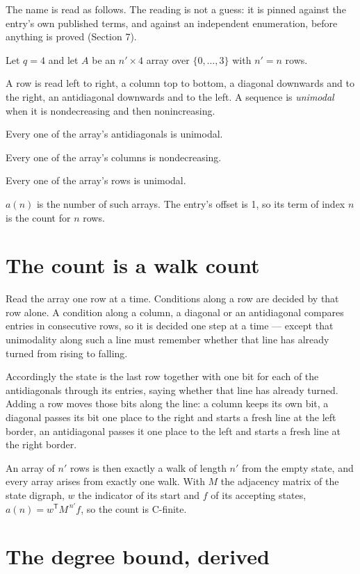 \documentclass[11pt]{article}
\theoremstyle{definition}
\begin{document}
The name is read as follows. The reading is not a guess: it is pinned against the entry's own published terms, and against an independent enumeration, before anything is proved (Section 7).

Let $q = 4$ and let $A$ be an $n' \times 4$ array over $\{0,\dots,3\}$ with $n' = n$ rows.

A row is read left to right, a column top to bottom, a diagonal downwards and to the right, an antidiagonal downwards and to the left. A sequence is {\itshape unimodal} when it is nondecreasing and then nonincreasing.

Every one of the array's antidiagonals is unimodal.

Every one of the array's columns is nondecreasing.

Every one of the array's rows is unimodal.

$a(n)$ is the number of such arrays. The entry's offset is 1, so its term of index $n$ is the count for $n$ rows.

\section{The count is a walk count}

Read the array one row at a time. Conditions along a row are decided by that row alone. A condition along a column, a diagonal or an antidiagonal compares entries in consecutive rows, so it is decided one step at a time --- except that unimodality along such a line must remember whether that line has already turned from rising to falling.

Accordingly the state is the last row together with one bit for each of the antidiagonals through its entries, saying whether that line has already turned. Adding a row moves those bits along the line: a column keeps its own bit, a diagonal passes its bit one place to the right and starts a fresh line at the left border, an antidiagonal passes it one place to the left and starts a fresh line at the right border.

An array of $n'$ rows is then exactly a walk of length $n'$ from the empty state, and every array arises from exactly one walk. With $M$ the adjacency matrix of the state digraph, $w$ the indicator of its start and $f$ of its accepting states, $a(n) = w^{\mathsf T}M^{\,n'}f$, so the count is C-finite.

\section{The degree bound, derived}
\end{document}
